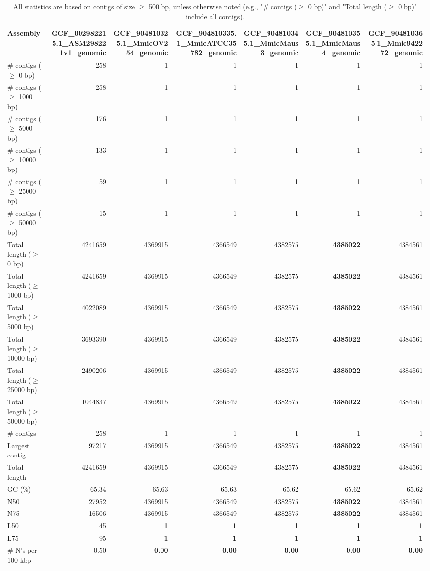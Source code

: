 \documentclass[12pt,a4paper]{article}
\begin{document}
\begin{table}[ht]
\begin{center}
\caption{All statistics are based on contigs of size $\geq$ 500 bp, unless otherwise noted (e.g., "\# contigs ($\geq$ 0 bp)" and "Total length ($\geq$ 0 bp)" include all contigs).}
\begin{tabular}{|l*{6}{|r}|}
\hline
Assembly & GCF\_002982215.1\_ASM298221v1\_genomic & GCF\_904810325.1\_MmicOV254\_genomic & GCF\_904810335.1\_MmicATCC35782\_genomic & GCF\_904810345.1\_MmicMaus3\_genomic & GCF\_904810355.1\_MmicMaus4\_genomic & GCF\_904810365.1\_Mmic942272\_genomic \\ \hline
\# contigs ($\geq$ 0 bp) & 258 & 1 & 1 & 1 & 1 & 1 \\ \hline
\# contigs ($\geq$ 1000 bp) & 258 & 1 & 1 & 1 & 1 & 1 \\ \hline
\# contigs ($\geq$ 5000 bp) & 176 & 1 & 1 & 1 & 1 & 1 \\ \hline
\# contigs ($\geq$ 10000 bp) & 133 & 1 & 1 & 1 & 1 & 1 \\ \hline
\# contigs ($\geq$ 25000 bp) & 59 & 1 & 1 & 1 & 1 & 1 \\ \hline
\# contigs ($\geq$ 50000 bp) & 15 & 1 & 1 & 1 & 1 & 1 \\ \hline
Total length ($\geq$ 0 bp) & 4241659 & 4369915 & 4366549 & 4382575 & {\bf 4385022} & 4384561 \\ \hline
Total length ($\geq$ 1000 bp) & 4241659 & 4369915 & 4366549 & 4382575 & {\bf 4385022} & 4384561 \\ \hline
Total length ($\geq$ 5000 bp) & 4022089 & 4369915 & 4366549 & 4382575 & {\bf 4385022} & 4384561 \\ \hline
Total length ($\geq$ 10000 bp) & 3693390 & 4369915 & 4366549 & 4382575 & {\bf 4385022} & 4384561 \\ \hline
Total length ($\geq$ 25000 bp) & 2490206 & 4369915 & 4366549 & 4382575 & {\bf 4385022} & 4384561 \\ \hline
Total length ($\geq$ 50000 bp) & 1044837 & 4369915 & 4366549 & 4382575 & {\bf 4385022} & 4384561 \\ \hline
\# contigs & 258 & 1 & 1 & 1 & 1 & 1 \\ \hline
Largest contig & 97217 & 4369915 & 4366549 & 4382575 & {\bf 4385022} & 4384561 \\ \hline
Total length & 4241659 & 4369915 & 4366549 & 4382575 & {\bf 4385022} & 4384561 \\ \hline
GC (\%) & 65.34 & 65.63 & 65.63 & 65.62 & 65.62 & 65.62 \\ \hline
N50 & 27952 & 4369915 & 4366549 & 4382575 & {\bf 4385022} & 4384561 \\ \hline
N75 & 16506 & 4369915 & 4366549 & 4382575 & {\bf 4385022} & 4384561 \\ \hline
L50 & 45 & {\bf 1} & {\bf 1} & {\bf 1} & {\bf 1} & {\bf 1} \\ \hline
L75 & 95 & {\bf 1} & {\bf 1} & {\bf 1} & {\bf 1} & {\bf 1} \\ \hline
\# N's per 100 kbp & 0.50 & {\bf 0.00} & {\bf 0.00} & {\bf 0.00} & {\bf 0.00} & {\bf 0.00} \\ \hline
\end{tabular}
\end{center}
\end{table}
\end{document}
